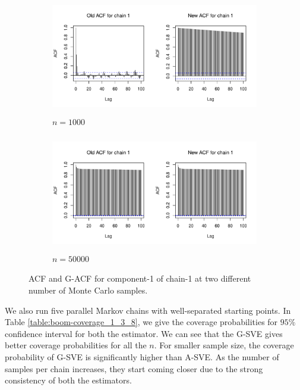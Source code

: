 \documentclass[11pt]{article}
\theoremstyle{remark}
\begin{document}
\begin{figure}[h]
    \centering
    \begin{subfigure}[h]{.8\textwidth}
      \centering
      \includegraphics[width = \textwidth, height = 2in]{plots/boom-acf,n=1000.pdf}
      \caption{$n = 1000$}
      \label{subfig:boom-acf_1e3}
    \end{subfigure}
    \begin{subfigure}[h]{.8\textwidth}
      \centering
      \includegraphics[width = \textwidth, height = 2in]{plots/boom-acf,n=50000.pdf}
      \caption{$n = 50000$}
      \label{subfig:boom-acf_1e4}
    \end{subfigure}
    \caption{ACF and G-ACF for component-1 of chain-1 at two different number of Monte Carlo samples. }
    \label{fig:boom-acf}
\end{figure}

We also run five parallel Markov chains with well-separated starting points. In Table \ref{table:boom-coverage_1_3_8}, we give the coverage probabilities for $95 \%$ confidence interval for both the estimator. We can see that the G-SVE gives better coverage probabilities for all the $n$. For smaller sample size, the coverage probability of G-SVE is significantly higher than A-SVE. As the number of samples per chain increases, they start coming closer due to the strong consistency of both the estimators.
\end{document}
